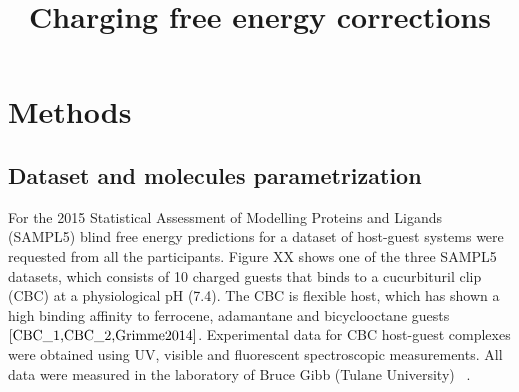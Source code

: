 \documentclass[11pt,oneside,a4paper]{article}
\title{Charging free energy corrections}
\begin{document}





\section{Methods}
\label{sec:methods}

\subsection{Dataset and molecules parametrization}
\label{sec:parametrization}


For the 2015 Statistical Assessment of Modelling Proteins and Ligands (SAMPL5) blind free energy predictions for a dataset of host-guest systems were requested from all the participants. Figure XX shows one of the three SAMPL5 datasets, which consists of 10 charged guests that binds to a cucurbituril clip (CBC) at a physiological pH (7.4).
The CBC is flexible host, which has shown a high binding affinity to ferrocene, adamantane and bicyclooctane guests $\cite{CBC_1,CBC_2,Grimme2014}$. Experimental data for CBC host-guest complexes were obtained using UV, visible and fluorescent spectroscopic measurements. All data were measured in the laboratory of Bruce Gibb (Tulane University) ~\cite{yin2016overview}.
\end{document}
